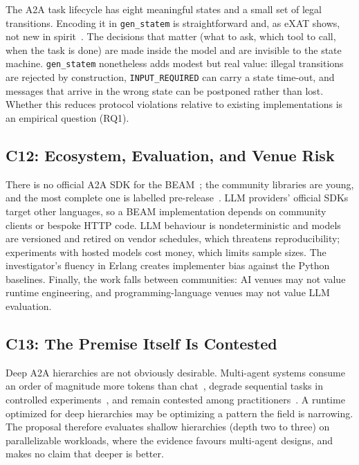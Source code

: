 \documentclass[conference,letterpaper]{IEEEtran}
\newcommand{\code}[1]{\texttt{#1}}
\newcommand{\gsm}{\code{gen\_statem}}
\begin{document}
The A2A task lifecycle has eight meaningful states and a small set of legal
transitions. Encoding it in \gsm{} is straightforward and, as eXAT shows,
not new in spirit~\cite{distefano2004}. The decisions that matter (what to
ask, which tool to call, when the task is done) are made inside the model
and are invisible to the state machine. \gsm{} nonetheless adds modest but
real value: illegal transitions are rejected by construction,
\code{INPUT\_REQUIRED} can carry a state time-out, and messages that arrive
in the wrong state can be postponed rather than lost. Whether this reduces
protocol violations relative to existing implementations is an empirical
question (RQ1).

\subsection{C12: Ecosystem, Evaluation, and Venue Risk}

There is no official A2A SDK for the BEAM~\cite{a2a-github}; the community
libraries are young, and the most complete one is labelled
pre-release~\cite{a2a-actioncard}. LLM providers' official SDKs target other
languages, so a BEAM implementation depends on community clients or bespoke
HTTP code. LLM behaviour is nondeterministic and models are versioned and
retired on vendor schedules, which threatens reproducibility; experiments
with hosted models cost money, which limits sample sizes. The investigator's
fluency in Erlang creates implementer bias against the Python baselines.
Finally, the work falls between communities: AI venues may not value
runtime engineering, and programming-language venues may not value LLM
evaluation.

\subsection{C13: The Premise Itself Is Contested}

Deep A2A hierarchies are not obviously desirable. Multi-agent systems
consume an order of magnitude more tokens than chat~\cite{anthropic2025},
degrade sequential tasks in controlled experiments~\cite{kim2025}, and
remain contested among practitioners~\cite{yan2025,yan2026}. A runtime
optimized for deep hierarchies may be optimizing a pattern the field is
narrowing. The proposal therefore evaluates shallow hierarchies (depth two
to three) on parallelizable workloads, where the evidence favours
multi-agent designs, and makes no claim that deeper is better.
\end{document}
